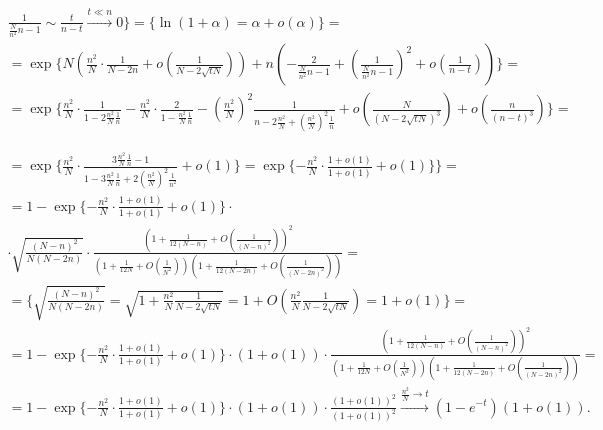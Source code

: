 \begin{multline*}
\frac{1}{\frac{N}{n^2} n - 1} \sim \frac{t}{n - t} \xrightarrow{t \ll n} 0 \big \} = \{ \ln (1+\alpha) = \alpha + o \left( \alpha \right) \} = \\
= \exp \{N \left( \frac{n^2}{N} \cdot \frac{1}{N-2n} + o \left( \frac{1}{N-2 \sqrt{tN}} \right) \right)
+ n \left(- \frac{2}{\frac{N}{n^2} n - 1} + \left( \frac{1}{\frac{N}{n^2} n - 1} \right) ^ 2 + o \left( \frac{1}{n - t} \right) \right)\} = \\
= \exp \{ \frac{n^2}{N} \cdot \frac{1}{1-2 \frac{n^2}{N} \frac{1}{n}} - \frac{n^2}{N} \cdot \frac{2}{1-\frac{n^2}{N} \frac{1}{n}} - \left( \frac{n^2}{N}\right) ^ 2 \frac{1}{n - 2 \frac{n^2}{N} + (\frac{n^2}{N})^2 \frac{1}{n}} + o \left( \frac{N}{(N - 2 \sqrt{tN})^3} \right) + o \left( \frac{n}{(n - t) ^ 3} \right) \} =
\end{multline*}

\begin{multline*}
= \exp \{ \frac{n^2}{N} \cdot \frac{3 \frac{n^2}{N} \frac{1}{n} - 1}{1-3 \frac{n^2}{N} \frac{1}{n} +2 (\frac{n^2}{N})^2 \frac{1}{n^2}} + o \left( 1 \right) \} = \exp \{ - \frac{n^2}{N} \cdot \frac{1 + o(1)}{1 + o(1)} + o \left( 1 \right) \}
\bigg \} = \\
= 1 - \exp \{ - \frac{n^2}{N} \cdot \frac{1 + o(1)}{1 + o(1)} + o \left( 1 \right) \} \cdot \\
\cdot \sqrt{\frac{(N-n)^2}{N(N-2n)}} \cdot \frac{(1 + \frac{1}{12(N-n)} + O \left(\frac{1}{(N-n)^2} \right)) ^ 2}{(1 + \frac{1}{12N} + O \left(\frac{1}{N^2} \right)) (1 + \frac{1}{12(N-2n)} + O \left(\frac{1}{(N-2n)^2} \right))} = \\
= \big \{ \sqrt{\frac{(N-n)^2}{N(N-2n)}} = \sqrt{1 + \frac{n^2}{N} \frac{1}{N - 2\sqrt{tN}}} = 1 + O(\frac{n^2}{N} \frac{1}{N - 2\sqrt{tN}}) = 1 + o(1) \big \} = \\
= 1 - \exp \{ - \frac{n^2}{N} \cdot \frac{1 + o(1)}{1 + o(1)} + o \left( 1 \right) \} \cdot (1 + o(1)) \cdot \frac{(1 + \frac{1}{12(N-n)} + O \left(\frac{1}{(N-n)^2} \right)) ^ 2}{(1 + \frac{1}{12N} + O \left(\frac{1}{N^2} \right)) (1 + \frac{1}{12(N-2n)} + O \left(\frac{1}{(N-2n)^2} \right))} = \\
= 1 - \exp \{ - \frac{n^2}{N} \cdot \frac{1 + o(1)}{1 + o(1)} + o \left( 1 \right) \} \cdot (1 + o(1)) \cdot \frac{(1 + o(1))^2}{(1 + o(1))^2} \xrightarrow{\frac{n^2}{N} \rightarrow t} (1 - e^{-t})(1 + o(1)).
\end{multline*}